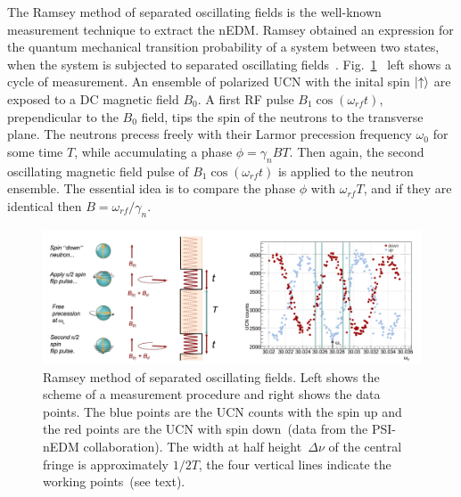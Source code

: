 The Ramsey method of separated oscillating fields is the well-known
measurement technique to extract the nEDM. Ramsey obtained an
expression for the quantum mechanical transition probability of a
system between two states, when the system is subjected to separated
oscillating
fields~\cite{ramsey1950}. Fig.~\ref{fig:ramsey}~\cite{Schmidt2016}
left shows a cycle of measurement. An ensemble of polarized UCN with
the inital spin $\ket{ \uparrow}$ are exposed to a DC magnetic field
$B_0$.  A first RF pulse $B_1 \cos (\omega_{rf}t)$, prependicular to
the $B_0$ field, tips the spin of the neutrons to the transverse
plane. The neutrons precess freely with their Larmor precession
frequency $\omega_0$ for some time $T$, while accumulating a phase
$\phi = \gamma_n BT$. Then again, the second oscillating magnetic
field pulse of $B_1 \cos (\omega_{rf}t)$ is applied to the neutron
ensemble. The essential idea is to compare the phase $\phi$ with
$\omega_{rf}T$, and if they are identical then
$B= \omega_{rf} / \gamma_n$.

\begin{figure}[h]
  \centering
  \includegraphics[width=1.0\textwidth]{ramsey.png}
  \caption{Ramsey method of separated oscillating fields. Left shows
    the scheme of a measurement procedure and right shows the data
    points. The blue points are the UCN counts with the spin up and
    the red points are the UCN with spin down~(data from the PSI-nEDM
    collaboration). The width at half height~$\Delta \nu$ of the
    central fringe is approximately $1/2T$, the four vertical lines
    indicate the working points~(see text).}
  \label{fig:ramsey}
\end{figure}

